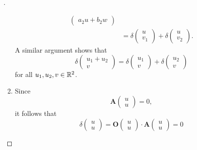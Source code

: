 \begin{proof}[]
\begin{enumerate}
\begin{align*}
\begin{pmatrix}
				                                                            a_2 u + b_2 w
			                                                            \end{pmatrix} \\
			                            & = \delta\begin{pmatrix}
				                                      u \\
				                                      v_1
			                                      \end{pmatrix} + \delta\begin{pmatrix}
				                                                            u \\
				                                                            v_2
			                                                            \end{pmatrix}.
		      \end{align*}
		      A similar argument shows that
		      \[
			      \delta\begin{pmatrix}
				      u_1 + u_2 \\
				      v
			      \end{pmatrix} = \delta\begin{pmatrix}
				      u_1 \\
				      v
			      \end{pmatrix} + \delta\begin{pmatrix}
				      u_2 \\
				      v
			      \end{pmatrix}
		      \]
		      for all \(u_1, u_2, v \in \mathbb{R}^2\).
		\item Since
		      \[
			      \mathbf{A}\begin{pmatrix}
				      u \\
				      u
			      \end{pmatrix} = 0,
		      \]
		      it follows that
		      \[
			      \delta\begin{pmatrix}
				      u \\
				      u
			      \end{pmatrix} = \mathbf{O}\begin{pmatrix}
				      u \\
				      u
			      \end{pmatrix} \cdot \mathbf{A}\begin{pmatrix}
				      u \\
				      u
			      \end{pmatrix} = 0
\]
\end{enumerate}
\end{proof}
